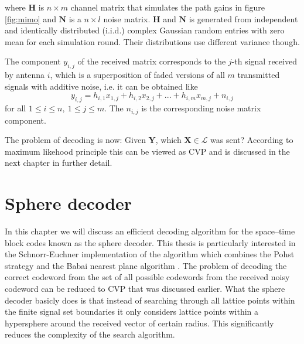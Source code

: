 \documentclass[english,12pt,a4paper,pdftex,sci,utf8]{aaltothesis}
\begin{document}
where $\mathbf{H}$ is $n \times m$ channel matrix that simulates the path gains in figure \ref{fig:mimo} and $\mathbf{N}$ is a $n\times l$ noise matrix. $\mathbf{H}$ and $\mathbf{N}$ is generated from independent and identically distributed  (i.i.d.) complex Gaussian random entries with zero mean for each simulation round. Their distributions use different variance though. 
\par The component $y_{i,j}$ of the received matrix corresponds to the $j$-th signal received by antenna $i$, which is a superposition of faded versions of all $m$ transmitted signals with additive noise, i.e. it can be obtained like
\begin{equation}
y_{i,j} = h_{i,1}x_{1,j}+h_{i,2}x_{2,j}+...+h_{i,m}x_{m,j}+n_{i,j}   
\label{eq:component}
\end{equation}
for all $1 \leq i \leq n, \ 1 \leq j \leq m$. The $n_{i,j}$ is the corresponding noise matrix component.
\par The problem of decoding is now: Given $\mathbf{Y}$, which $\mathbf{X} \in \mathcal{L}$ was sent? According to maximum likehood principle this can be viewed as CVP \cite{mia} and is discussed in the next chapter in further detail.

\clearpage

\section{Sphere decoder}

In this chapter we will discuss an efficient decoding algorithm for the space--time block codes known as the sphere decoder. This thesis is particularly interested in the Schnorr-Euchner implementation of the algorithm which combines the Pohst strategy and the Babai nearest plane algorithm \cite{agrell}. The problem of decoding the correct codeword from the set of all possible codewords from the received noisy codeword can be reduced to CVP that was discussed earlier. What the sphere decoder basicly does is that instead of searching through all lattice points within the finite signal set boundaries it only considers lattice points within a hypersphere around the received vector of certain radius. This significantly reduces the complexity of the search algorithm. 
\end{document}
